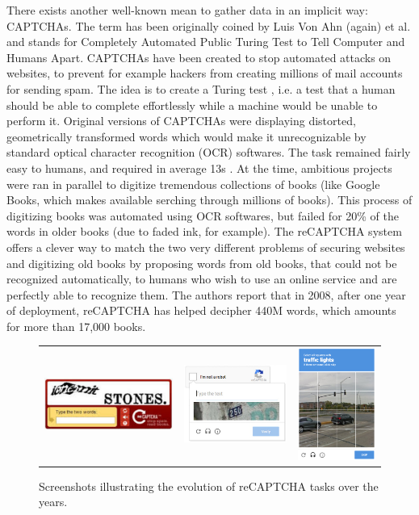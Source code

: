 There exists another well-known mean to gather data in an implicit way: CAPTCHAs. The term has been originally coined by Luis Von Ahn (again) et al. \cite{von2003captcha} and stands for Completely Automated Public Turing Test to Tell Computer and Humans Apart. CAPTCHAs have been created to stop automated attacks on websites, to prevent for example hackers from creating millions of mail accounts for sending spam. The idea is to create a Turing test \cite{machinery1950computing}, i.e. a test that a human should be able to complete effortlessly while a machine would be unable to perform it. Original versions of CAPTCHAs were displaying distorted, geometrically transformed words which would make it unrecognizable by standard optical character recognition (OCR) softwares. The task remained fairly easy to humans, and required in average 13s \cite{von2008recaptcha}. At the time, ambitious projects were ran in parallel to digitize tremendous collections of books (like Google Books, which makes available serching through millions of books). This process of digitizing books was automated using OCR softwares, but failed for 20\% of the words in older books (due to faded ink, for example). The reCAPTCHA system offers a clever way to match the two very different problems of securing websites and digitizing old books by proposing words from old books, that could not be recognized automatically, to humans who wish to use an online service and are perfectly able to recognize them. The authors report that in 2008, after one year of deployment, reCAPTCHA has helped decipher 440M words, which amounts for more than 17,000 books.

\begin{figure}
	\centering
	\begin{tabular}{ccc}
\includegraphics[width=5cm]{assets/img/recaptcha.png} & \includegraphics[width=4cm]{assets/img/recaptcha-streetview.jpg} & 
\includegraphics[width=3cm]{assets/img/reCAPTCHA_v2.png} \\
	\end{tabular}
	\caption{Screenshots illustrating the evolution of reCAPTCHA \cite{von2008recaptcha} tasks over the years.}
	\label{fig:recaptcha}
\end{figure}

